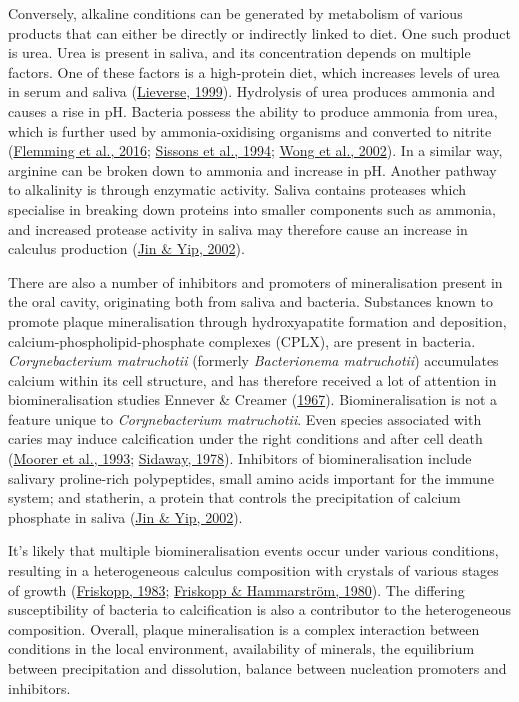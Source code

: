 \documentclass[
  letterpaper,
]{book}
\begin{document}
Conversely, alkaline conditions can be generated by metabolism of
various products that can either be directly or indirectly linked to
diet. One such product is urea. Urea is present in saliva, and its
concentration depends on multiple factors. One of these factors is a
high-protein diet, which increases levels of urea in serum and saliva
(\protect\hyperlink{ref-lieverseDietAetiology1999}{Lieverse, 1999}).
Hydrolysis of urea produces ammonia and causes a rise in pH. Bacteria
possess the ability to produce ammonia from urea, which is further used
by ammonia-oxidising organisms and converted to nitrite
(\protect\hyperlink{ref-flemmingBiofilmsEmergent2016}{Flemming et al.,
2016}; \protect\hyperlink{ref-sissonsPHResponse1994}{Sissons et al.,
1994}; \protect\hyperlink{ref-wongCalciumPhosphate2002}{Wong et al.,
2002}). In a similar way, arginine can be broken down to ammonia and
increase in pH. Another pathway to alkalinity is through enzymatic
activity. Saliva contains proteases which specialise in breaking down
proteins into smaller components such as ammonia, and increased protease
activity in saliva may therefore cause an increase in calculus
production (\protect\hyperlink{ref-jinSupragingivalCalculus2002}{Jin \&
Yip, 2002}).

There are also a number of inhibitors and promoters of mineralisation
present in the oral cavity, originating both from saliva and bacteria.
Substances known to promote plaque mineralisation through hydroxyapatite
formation and deposition, calcium-phospholipid-phosphate complexes
(CPLX), are present in bacteria. \emph{Corynebacterium matruchotii}
(formerly \emph{Bacterionema matruchotii}) accumulates calcium within
its cell structure, and has therefore received a lot of attention in
biomineralisation studies Ennever \& Creamer
(\protect\hyperlink{ref-enneverMicrobiologicCalcification1967}{1967}).
Biomineralisation is not a feature unique to \emph{Corynebacterium
matruchotii}. Even species associated with caries may induce
calcification under the right conditions and after cell death
(\protect\hyperlink{ref-moorerCalcificationCariogenic1993}{Moorer et
al., 1993};
\protect\hyperlink{ref-sidawayMicrobiologicalStudy1978a}{Sidaway,
1978}). Inhibitors of biomineralisation include salivary proline-rich
polypeptides, small amino acids important for the immune system; and
statherin, a protein that controls the precipitation of calcium
phosphate in saliva
(\protect\hyperlink{ref-jinSupragingivalCalculus2002}{Jin \& Yip,
2002}).

It's likely that multiple biomineralisation events occur under various
conditions, resulting in a heterogeneous calculus composition with
crystals of various stages of growth
(\protect\hyperlink{ref-friskoppUltrastructureNondecalcified1983}{Friskopp,
1983}; \protect\hyperlink{ref-friskoppComparativeScanning1980}{Friskopp
\& Hammarström, 1980}). The differing susceptibility of bacteria to
calcification is also a contributor to the heterogeneous composition.
Overall, plaque mineralisation is a complex interaction between
conditions in the local environment, availability of minerals, the
equilibrium between precipitation and dissolution, balance between
nucleation promoters and inhibitors.
\end{document}
